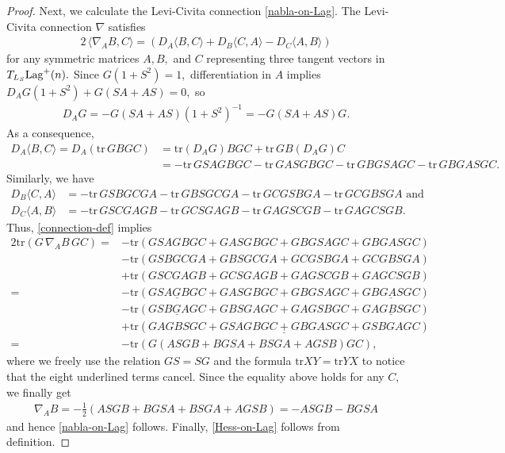 \documentclass[11pt]{amsart}
\numberwithin{equation}{section}
\theoremstyle{definition}
\theoremstyle{definition}
\newcommand{\udl}[1]{\underline{#1}}
\newcommand{\pair}[1]{\langle #1\rangle}
\newcommand{\pr}[1]{\left(#1\right)}
\newcommand{\tr}{\text{tr}}
\newcommand{\n}{\nabla}
\begin{document}
\begin{proof}
	
	Next, we calculate the Levi-Civita connection \eqref{nabla-on-Lag}.
	The Levi-Civita connection $\n$ satisfies
	\begin{align}\label{connection-def}
	2\, \pair{\n_AB, C}
	= \pr{
		D_A\pair{B,C}
		+ D_B\pair{C,A}
		- D_C\pair{A,B}
	}
	\end{align}
	for any symmetric matrices $A,B,$ and $C$ representing three tangent vectors in $T_{L_S}{\rm Lag}^+(n).$
	Since $G\pr{1+S^2}=1,$ differentiation in $A$ implies
	$D_AG\pr{1+S^2}
	+ G\pr{SA+AS}
	= 0,$
	so
	\begin{align}\label{DG}
	D_AG
	= - G\pr{SA+AS} \pr{1+S^2}^{-1}
	= - G\pr{SA+AS} G.
	\end{align}
	As a consequence,
	\begin{align*}
	D_A\pair{B,C}
	= D_A\pr{\tr\, GBGC}
	& = \tr \pr{D_AG}BGC
	+ \tr\, GB\pr{D_AG}C\\
	& = - \tr\, GSAGBGC
	- \tr\, GASGBGC
	- \tr\, GBGSAGC
	- \tr\, GBGASGC.
	\end{align*}
	Similarly, we have
	\begin{align*}
	D_B\pair{C,A}
	&= - \tr\, GSBGCGA
	- \tr\, GBSGCGA 
	- \tr\, GCGSBGA
	- \tr\, GCGBSGA 
	\text{ and}\\
	D_C\pair{A,B}
	&= - \tr\, GSCGAGB
	- \tr\, GCSGAGB 
	- \tr\, GAGSCGB
	- \tr\, GAGCSGB.
	\end{align*}
	Thus, \eqref{connection-def} implies
	\begin{align*}
	2\tr \pr{G\,\n_AB\,GC}
	= & -\tr(GSAGBGC + GASGBGC+GBGSAGC+GBGASGC)\\
	& - \tr(GSBGCGA+GBSGCGA+GCGSBGA+GCGBSGA)\\
	& + \tr(GSCGAGB+GCSGAGB+GAGSCGB+GAGCSGB)\\
	= & -\tr(\udl{GSAGBGC} + GASGBGC+GBGSAGC+\udl{GBGASGC})\\
	& - \tr(\udl{GSBGAGC}+GBSGAGC+GAGSBGC+\udl{GAGBSGC})\\
	& + \tr(\udl{GAGBSGC+GSAGBGC+GBGASGC+GSBGAGC})\\
	= & -\tr \pr{G\pr{ASGB + BGSA + BSGA + AGSB}GC},
	\end{align*}
	where we freely use the relation $GS=SG$ and the formula $\tr XY=\tr YX$ to notice that the eight underlined terms cancel.
	Since the equality above holds for any $C,$ we finally get
	\begin{align*}
	\n_A B 
	= -\frac 12(ASGB + BGSA + BSGA + AGSB)
	= - ASGB - BGSA
	\end{align*}
	and hence \eqref{nabla-on-Lag} follows.
	Finally, \eqref{Hess-on-Lag} follows from definition.
\end{proof}
\end{document}
